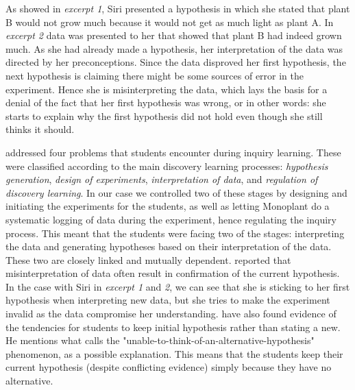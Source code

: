 As showed in \emph{excerpt 1}, Siri presented a hypothesis in which she stated that plant B would not grow much because it would not get as much light as plant A. In \emph{excerpt 2} data was presented to her that showed that plant B had indeed grown much. As she had already made a hypothesis, her interpretation of the data was directed by her preconceptions. Since the data disproved her first hypothesis, the next hypothesis is claiming there might be some sources of error in the experiment. Hence she is misinterpreting the data, which lays the basis for a denial of the fact that her first hypothesis was wrong, or in other words: she starts to explain why the first hypothesis did not hold even though she still thinks it should.

\citet{de1998scientific} addressed four problems that students encounter during inquiry learning. These were classified according to the main discovery learning processes: \textit{hypothesis generation}, \textit{design of experiments}, \textit{interpretation of data}, and \textit{regulation of discovery learning}. In our case we controlled two of these stages by designing and initiating the experiments for the students, as well as letting Monoplant do a systematic logging of data during the experiment, hence regulating the inquiry process. This meant that the students were facing two of the stages: interpreting the data and generating hypotheses based on their interpretation of the data. These two are closely linked and mutually dependent. \citeauthor*{klahr1993heuristics} \citetext{\citeyear{klahr1993heuristics}, referenced in \citealp{de1998scientific}} reported that misinterpretation of data often result in confirmation of the current hypothesis. In the case with Siri in \emph{excerpt 1} and \emph{2}, we can see that she is sticking to her first hypothesis when interpreting new data, but she tries to make the experiment invalid as the data compromise her understanding. \citeauthor*{dunbar1993concept} \citetext{\citeyear{dunbar1993concept}, referenced in \citealp{de1998scientific}} have also found evidence of the tendencies for students to keep initial hypothesis rather than stating a new. He mentions what calls the "unable-to-think-of-an-alternative-hypothesis" phenomenon, as a possible explanation. This means that the students keep their current hypothesis (despite conflicting evidence) simply because they have no alternative.

